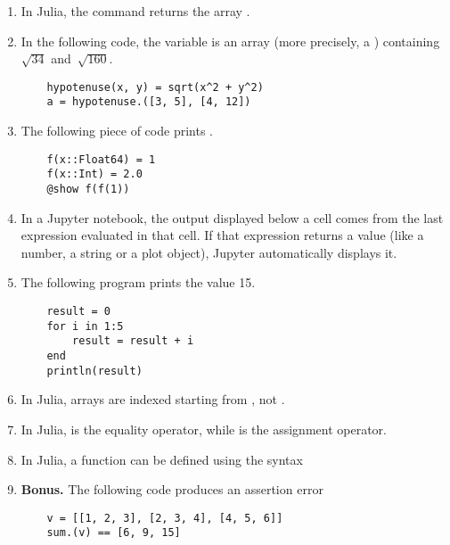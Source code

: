 \documentclass[a4paper]{article}
\begin{document}
\begin{enumerate}
    \item
        In Julia, the command  returns the array \julia{[1, 4, 9]}.

    \item
        In the following code,
        the variable  is an array (more precisely, a ) containing~$\sqrt{34}$ and~$\sqrt{160}$.
        \begin{verbatim}
    hypotenuse(x, y) = sqrt(x^2 + y^2)
    a = hypotenuse.([3, 5], [4, 12])
        \end{verbatim}

    \item
        The following piece of code prints .

        \begin{verbatim}
    f(x::Float64) = 1
    f(x::Int) = 2.0
    @show f(f(1))
        \end{verbatim}


    \item
        In a Jupyter notebook, the output displayed below a cell comes from the last expression evaluated in that cell. If that expression returns a value 
        (like a number, a string or a plot object), Jupyter automatically displays it.

    \item
        The following program prints the value 15.

        \begin{verbatim}
    result = 0
    for i in 1:5
        result = result + i
    end
    println(result)
        \end{verbatim}

    \item 
        In Julia, arrays are indexed starting from , not .
 
    \item
        In Julia, \julia{=} is the equality operator, while \julia{==} is the assignment operator.

    \item
        In Julia, a function can be defined using the syntax 

    \item
        \textbf{Bonus.} The following code produces an assertion error
        \begin{verbatim}
    v = [[1, 2, 3], [2, 3, 4], [4, 5, 6]]
    sum.(v) == [6, 9, 15]
        \end{verbatim}


\end{enumerate}
\end{document}
